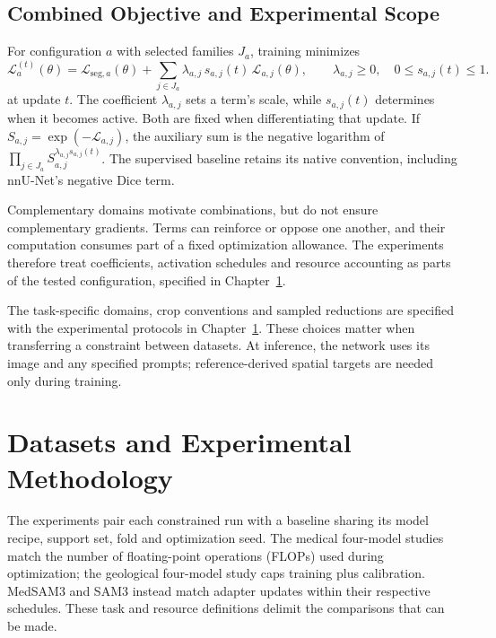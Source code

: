 \documentclass[12pt,a4paper]{article}
\begin{document}
\subsection{Combined Objective and Experimental Scope}
\label{sec:constraint-combination}

For configuration $a$ with selected families $J_a$, training minimizes
\begin{equation}
\mathcal{L}_{a}^{(t)}(\theta)
=\mathcal{L}_{\mathrm{seg},a}(\theta)
+\sum_{j\in J_a}\lambda_{a,j}\,s_{a,j}(t)\,
\mathcal{L}_{a,j}(\theta),
\qquad \lambda_{a,j}\geq0,\quad 0\leq s_{a,j}(t)\leq1.
\label{eq:scheduled-constraint-objective}
\end{equation}
at update $t$. The coefficient $\lambda_{a,j}$ sets a term's scale,
while $s_{a,j}(t)$ determines when it becomes active. Both are fixed
when differentiating that update. If
$S_{a,j}=\exp(-\mathcal L_{a,j})$, the auxiliary sum is the negative
logarithm of
$\prod_{j\in J_a}S_{a,j}^{\lambda_{a,j}s_{a,j}(t)}$.
The supervised baseline retains its native convention, including
nnU-Net's negative Dice term.

Complementary domains motivate combinations, but do not ensure
complementary gradients. Terms can reinforce or oppose one another,
and their computation consumes part of a fixed optimization allowance.
The experiments therefore treat coefficients, activation schedules
and resource accounting as parts of the tested configuration,
specified in Chapter~\ref{sec:methodology}.

The task-specific domains, crop conventions and sampled reductions
are specified with the experimental protocols in
Chapter~\ref{sec:methodology}. These choices matter when transferring a
constraint between datasets. At inference, the network uses its image
and any specified prompts; reference-derived spatial targets are needed
only during training.

\clearpage
\section{Datasets and Experimental Methodology}
\label{sec:methodology}

The experiments pair each constrained run with a baseline sharing its
model recipe, support set, fold and optimization seed. The medical
four-model studies match the number of floating-point operations (FLOPs)
used during optimization; the geological four-model
study caps training plus calibration. MedSAM3 and SAM3 instead match
adapter updates within their respective schedules. These task and
resource definitions delimit the comparisons that can be made.
\end{document}
